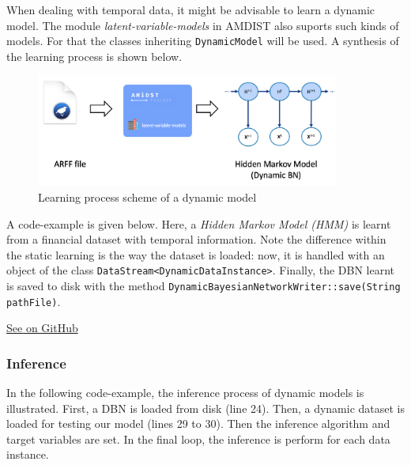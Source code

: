 \documentclass[10pt,a4paper]{article}
\begin{document}
When dealing with temporal data, it might be advisable to learn a dynamic model. The module \textit{latent-variable-models} in AMDIST also suports such kinds of models. For that the classes inheriting \texttt{DynamicModel} will be used. A synthesis of the learning process is shown below.\newline 



\begin{figure}[h!]
	\centering
	\includegraphics[width=10cm]{img/dynamicLearning.png}
	\caption{Learning process scheme of a dynamic model}
	\label{fig:lvmodels:dynamic:learning:scheme}	
\end{figure}


A code-example is given below. Here, a \textit{Hidden Markov Model (HMM)} is learnt from a financial dataset with temporal information. Note the difference within the static learning is the way the dataset is loaded: now, it is handled with an object of the class \texttt{DataStream<DynamicDataInstance>}. Finally, the DBN learnt is saved to disk with the method \texttt{DynamicBayesianNetworkWriter::save(String pathFile)}.\newline 


\href{https://github.com/amidst/tutorial/blob/master/src/main/java/eu/amidst/tutorial/usingAmidst/examples/DynamicModelLearning.java}{See on GitHub}

\subsubsection{Inference}

In the following code-example, the inference process of dynamic models is illustrated. First, a DBN is loaded from disk (line 24). Then, a dynamic dataset is loaded for testing our model (lines 29 to 30). Then the inference algorithm and target variables are set. In the final loop, the inference is perform for each data instance.\newline 
\end{document}
